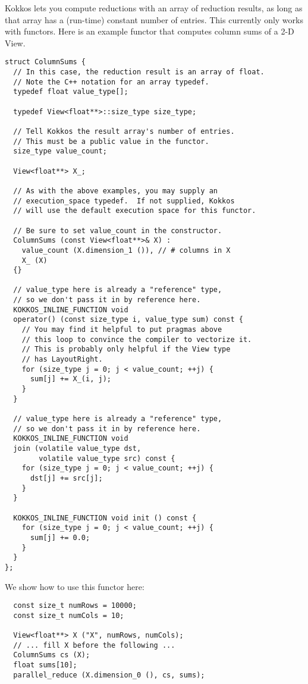 Kokkos lets you compute reductions with an array of reduction results,
as long as that array has a (run-time) constant number of entries.
This currently only works with functors.  Here is an example functor
that computes column sums of a 2-D View.
\begin{lstlisting}
struct ColumnSums {
  // In this case, the reduction result is an array of float.
  // Note the C++ notation for an array typedef.
  typedef float value_type[];

  typedef View<float**>::size_type size_type;

  // Tell Kokkos the result array's number of entries.
  // This must be a public value in the functor.
  size_type value_count;

  View<float**> X_;

  // As with the above examples, you may supply an
  // execution_space typedef.  If not supplied, Kokkos
  // will use the default execution space for this functor.

  // Be sure to set value_count in the constructor.
  ColumnSums (const View<float**>& X) : 
    value_count (X.dimension_1 ()), // # columns in X
    X_ (X)
  {}

  // value_type here is already a "reference" type,
  // so we don't pass it in by reference here.
  KOKKOS_INLINE_FUNCTION void
  operator() (const size_type i, value_type sum) const {
    // You may find it helpful to put pragmas above
    // this loop to convince the compiler to vectorize it.
    // This is probably only helpful if the View type
    // has LayoutRight.
    for (size_type j = 0; j < value_count; ++j) {
      sum[j] += X_(i, j);
    }
  }

  // value_type here is already a "reference" type,
  // so we don't pass it in by reference here.
  KOKKOS_INLINE_FUNCTION void
  join (volatile value_type dst,
        volatile value_type src) const {
    for (size_type j = 0; j < value_count; ++j) {
      dst[j] += src[j];
    }
  }

  KOKKOS_INLINE_FUNCTION void init () const {
    for (size_type j = 0; j < value_count; ++j) {
      sum[j] += 0.0;
    }
  }
};
\end{lstlisting}
We show how to use this functor here:
\begin{lstlisting}
  const size_t numRows = 10000;
  const size_t numCols = 10;

  View<float**> X ("X", numRows, numCols);
  // ... fill X before the following ...
  ColumnSums cs (X);
  float sums[10];
  parallel_reduce (X.dimension_0 (), cs, sums);
\end{lstlisting}

